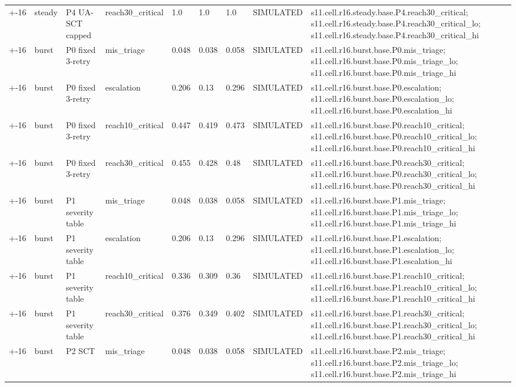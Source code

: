 \begin{table}[t]
\begin{tabular}{lllllllll}
+-16 & steady & P4 UA-SCT capped & reach30\_critical & 1.0 & 1.0 & 1.0 & SIMULATED & s11.cell.r16.steady.base.P4.reach30\_critical; s11.cell.r16.steady.base.P4.reach30\_critical\_lo; s11.cell.r16.steady.base.P4.reach30\_critical\_hi \\
+-16 & burst & P0 fixed 3-retry & mis\_triage & 0.048 & 0.038 & 0.058 & SIMULATED & s11.cell.r16.burst.base.P0.mis\_triage; s11.cell.r16.burst.base.P0.mis\_triage\_lo; s11.cell.r16.burst.base.P0.mis\_triage\_hi \\
+-16 & burst & P0 fixed 3-retry & escalation & 0.206 & 0.13 & 0.296 & SIMULATED & s11.cell.r16.burst.base.P0.escalation; s11.cell.r16.burst.base.P0.escalation\_lo; s11.cell.r16.burst.base.P0.escalation\_hi \\
+-16 & burst & P0 fixed 3-retry & reach10\_critical & 0.447 & 0.419 & 0.473 & SIMULATED & s11.cell.r16.burst.base.P0.reach10\_critical; s11.cell.r16.burst.base.P0.reach10\_critical\_lo; s11.cell.r16.burst.base.P0.reach10\_critical\_hi \\
+-16 & burst & P0 fixed 3-retry & reach30\_critical & 0.455 & 0.428 & 0.48 & SIMULATED & s11.cell.r16.burst.base.P0.reach30\_critical; s11.cell.r16.burst.base.P0.reach30\_critical\_lo; s11.cell.r16.burst.base.P0.reach30\_critical\_hi \\
+-16 & burst & P1 severity table & mis\_triage & 0.048 & 0.038 & 0.058 & SIMULATED & s11.cell.r16.burst.base.P1.mis\_triage; s11.cell.r16.burst.base.P1.mis\_triage\_lo; s11.cell.r16.burst.base.P1.mis\_triage\_hi \\
+-16 & burst & P1 severity table & escalation & 0.206 & 0.13 & 0.296 & SIMULATED & s11.cell.r16.burst.base.P1.escalation; s11.cell.r16.burst.base.P1.escalation\_lo; s11.cell.r16.burst.base.P1.escalation\_hi \\
+-16 & burst & P1 severity table & reach10\_critical & 0.336 & 0.309 & 0.36 & SIMULATED & s11.cell.r16.burst.base.P1.reach10\_critical; s11.cell.r16.burst.base.P1.reach10\_critical\_lo; s11.cell.r16.burst.base.P1.reach10\_critical\_hi \\
+-16 & burst & P1 severity table & reach30\_critical & 0.376 & 0.349 & 0.402 & SIMULATED & s11.cell.r16.burst.base.P1.reach30\_critical; s11.cell.r16.burst.base.P1.reach30\_critical\_lo; s11.cell.r16.burst.base.P1.reach30\_critical\_hi \\
+-16 & burst & P2 SCT & mis\_triage & 0.048 & 0.038 & 0.058 & SIMULATED & s11.cell.r16.burst.base.P2.mis\_triage; s11.cell.r16.burst.base.P2.mis\_triage\_lo; s11.cell.r16.burst.base.P2.mis\_triage\_hi \\

\end{tabular}
\end{table}
